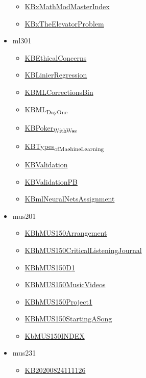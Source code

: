 \documentclass[11pt]{article}
\begin{document}
\begin{itemize}
\begin{itemize}
\item \href{mathmod555/KBxMathModMasterIndex.org}{KBxMathModMasterIndex}
\item \href{mathmod555/KBxTheElevatorProblem.org}{KBxTheElevatorProblem}
\end{itemize}
\item ml301
\begin{itemize}
\item \href{ml301/KBEthicalConcerns.org}{KBEthicalConcerns}
\item \href{ml301/KBLinierRegression.org}{KBLinierRegression}
\item \href{ml301/KBMLCorrectionsBin.org}{KBMLCorrectionsBin}
\item \href{ml301/KBML\_Day\_One.org}{KBML\textsubscript{Day}\textsubscript{One}}
\item \href{ml301/KBPoker\_With\_Wes.org}{KBPoker\textsubscript{With}\textsubscript{Wes}}
\item \href{ml301/KBTypes\_of\_Machine\_Learning.org}{KBTypes\textsubscript{of}\textsubscript{Machine}\textsubscript{Learning}}
\item \href{ml301/KBValidation.org}{KBValidation}
\item \href{ml301/KBValidationPB.org}{KBValidationPB}
\item \href{ml301/KBmlNeuralNetsAssignment.org}{KBmlNeuralNetsAssignment}
\end{itemize}
\item mus201
\begin{itemize}
\item \href{mus201/KBhMUS150Arrangement.org}{KBhMUS150Arrangement}
\item \href{mus201/KBhMUS150CriticalListeningJournal.org}{KBhMUS150CriticalListeningJournal}
\item \href{mus201/KBhMUS150D1.org}{KBhMUS150D1}
\item \href{mus201/KBhMUS150MusicVideos.org}{KBhMUS150MusicVideos}
\item \href{mus201/KBhMUS150Project1.org}{KBhMUS150Project1}
\item \href{mus201/KBhMUS150StartingASong.org}{KBhMUS150StartingASong}
\item \href{mus201/KbMUS150INDEX.org}{KbMUS150INDEX}
\end{itemize}
\item mus231
\begin{itemize}
\item \href{mus231/KB20200824111126.org}{KB20200824111126}
\end{itemize}

\end{itemize}
\end{document}
